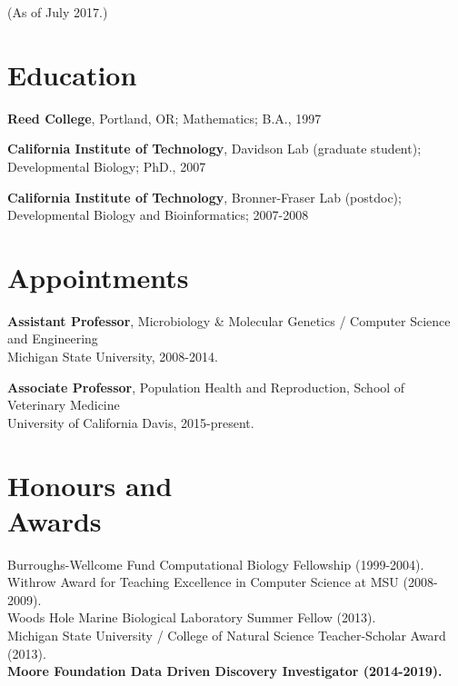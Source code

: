 \documentclass[margin,line]{resume}
\begin{document}
\pagestyle{plain}


\begin{resume}



    {\small (As of July 2017.)}

    \section{\mysidestyle Education}

    {\bf Reed College}, Portland, OR; Mathematics; B.A., 1997

    \vspace{2mm}

    {\bf California Institute of Technology}, Davidson Lab (graduate student);
\\
Developmental Biology; PhD., 2007

    \vspace{2mm}

    {\bf California Institute of Technology}, Bronner-Fraser Lab (postdoc);\\
 Developmental Biology and Bioinformatics; 2007-2008

    \vspace{2mm}

    \section{\mysidestyle Appointments}

    {\bf Assistant Professor}, 
Microbiology \& Molecular Genetics / Computer Science and Engineering\\
Michigan State University, 2008-2014.

    {\bf Associate Professor}, 
Population Health and Reproduction, School of Veterinary Medicine \\
University of California Davis, 2015-present.

    \section{\mysidestyle Honours and\\Awards} 

Burroughs-Wellcome Fund Computational Biology Fellowship (1999-2004).\\
Withrow Award for Teaching Excellence in Computer Science at MSU (2008-2009). \\
Woods Hole Marine Biological Laboratory Summer Fellow (2013).\\
Michigan State University / College of Natural Science Teacher-Scholar Award (2013).\\
{\bf Moore Foundation Data Driven Discovery Investigator (2014-2019).}



\end{resume}
\end{document}
